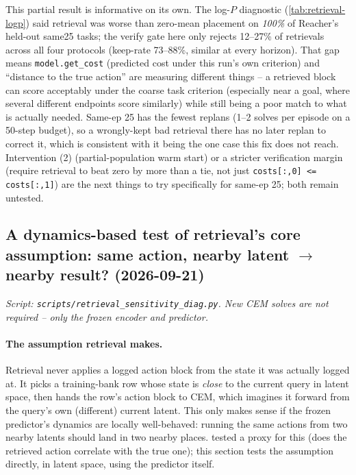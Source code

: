 \documentclass[11pt]{article}
\begin{document}
This partial result is informative on its own. The log-$P$ diagnostic
(\cref{tab:retrieval-logp}) said retrieval was worse than zero-mean placement on \emph{100\%}
of Reacher's held-out same25 tasks; the verify gate here only rejects 12--27\% of retrievals
across all four protocols (keep-rate 73--88\%, similar at every horizon). That gap means
\texttt{model.get\_cost} (predicted cost under this run's own criterion) and ``distance to the
true action'' are measuring different things -- a retrieved block can score acceptably under
the coarse task criterion (especially near a goal, where several different endpoints score
similarly) while still being a poor match to what is actually needed. Same-ep 25 has the fewest
replans (1--2 solves per episode on a 50-step budget), so a wrongly-kept bad retrieval there has
no later replan to correct it, which is consistent with it being the one case this fix does not
reach. Intervention (2) (partial-population warm start) or a stricter verification margin
(require retrieval to beat zero by more than a tie, not just \texttt{costs[:,0] <=
costs[:,1]}) are the next things to try specifically for same-ep 25; both remain untested.

\subsection{A dynamics-based test of retrieval's core assumption: same action, nearby latent
$\to$ nearby result? (2026-09-21)}
\label{sec:retrieval-dynamics-sensitivity}
\emph{Script: \texttt{scripts/retrieval\_sensitivity\_diag.py}. New CEM solves are not
required -- only the frozen encoder and predictor.}

\paragraph{The assumption retrieval makes.} Retrieval never applies a logged action block from
the state it was actually logged at. It picks a training-bank row whose state is
\emph{close} to the current query in latent space, then hands the row's action block to CEM,
which imagines it forward from the query's own (different) current latent. This only makes
sense if the frozen predictor's dynamics are locally well-behaved: running the same actions
from two nearby latents should land in two nearby places. 
tested a proxy for this (does the retrieved action correlate with the true one); this section
tests the assumption directly, in latent space, using the predictor itself.
\end{document}
